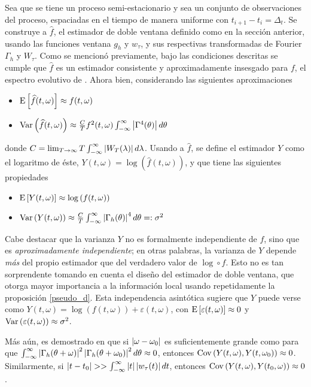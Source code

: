 Sea \xt que se tiene un proceso semi-estacionario y sea \xtd un conjunto de observaciones
del proceso, espaciadas en el tiempo de manera uniforme con $t_{i+1}-t_i = \Delta_t$.
Se construye a $\widehat{f}$, el estimador de doble ventana definido como en la sección anterior,
usando las funciones ventana $g_h$ y $w_\tau$, y sus respectivas transformadas de Fourier
$\Gamma_h$ y $W_\tau$. Como se mencionó previamente, bajo las condiciones descritas se cumple
que $\widehat{f}$ es un estimador consistente y aproximadamente insesgado para $f$, el espectro
evolutivo de \xt. Ahora bien, considerando las siguientes aproximaciones
%
\begin{itemize}
\item $\mathrm{E}\left[ \widehat{f}(t,\omega) \right] \approx f(t,\omega)$
\item $\mathrm{Var}\left( \widehat{f}(t,\omega) \right) \approx 
\frac{C}{T} f^{2}(t,\omega) \int_{-\infty}^{\infty} \left| \Gamma^{4}(\theta) \right| d\theta$
\end{itemize}
%
donde $C = \lim_{T\rightarrow \infty} T \int_{-\infty}^{\infty} \left| W_T(\lambda) \right| d\lambda$.
Usando a $\widehat{f}$,
se define el estimador $Y$ como el logaritmo de éste, 
$Y(t,\omega) = \log\left(\widehat{f}(t,\omega)\right)$,
y que tiene las siguientes propiedades
%
\begin{itemize}
\item $\mathrm{E}\left[ Y(t,\omega) \right] \approx \log\left(f(t,\omega)\right)$
\item $\mathrm{Var}\left( Y(t,\omega) \right) \approx 
\frac{C}{T} \int_{-\infty}^{\infty} \left| \Gamma_h(\theta) \right|^{4} d\theta =: \sigma^{2}$
\end{itemize}
%

Cabe destacar que la varianza $Y$ no es formalmente independiente de $f$, sino que es
\textit{aproximadamente independiente}; en otras palabras, la varianza de $Y$ depende 
\textit{más} del propio estimador que del verdadero valor de $\log\circ f$.
Esto no es tan sorprendente tomando en cuenta el diseño del estimador de doble ventana, que
otorga mayor importancia a la información local usando repetidamente la proposición
\ref{pseudo_d}. Esta independencia asintótica sugiere que $Y$ puede verse como
%
$Y(t,\omega) = \log\left(f(t,\omega) \right) + \varepsilon(t,\omega)$,
%
con $\mathrm{E}\left[ \varepsilon(t,\omega) \right] \approx 0$ y $\mathrm{Var}\left( \varepsilon(t,\omega) \right) \approx
\sigma^{2}$.

Más aún,
es demostrado en \cite{Priestley66} que si
$\left| \omega-\omega_0 \right|$ es suficientemente grande como para que
$\int_{-\infty}^{\infty} \left| \Gamma_h(\theta+\omega) \right|^{2}\left| \Gamma_h(\theta+\omega_0) \right|^{2} d\theta \approx 0$,
entonces 
%
$\mathrm{Cov}\left( Y(t,\omega),Y(t,\omega_0) \right) \approx 0$.
%
Similarmente, si $\left| t-t_0 \right| >> \int_{-\infty}^{\infty} \left| t \right| \left| w_\tau (t) \right| dt $, entonces
%
$\mathrm{Cov}\left( Y(t,\omega),Y(t_0,\omega) \right) \approx 0$.

